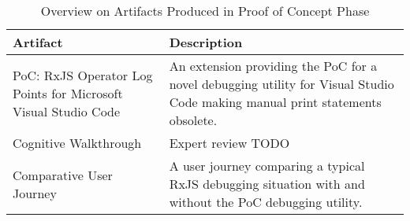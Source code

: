 
\begin{table}[H]
  \label{tbl:phase-2-artifacts}
  \caption{Overview on Artifacts Produced in Proof of Concept Phase}

  \begin{tabular}{|l|l|}
    \hline
    \bf{Artifact}       & \bf{Description} \\ \hline
    PoC: RxJS Operator Log Points for Microsoft Visual Studio Code & An extension providing the PoC for a novel debugging utility for Visual Studio Code making manual print statements obsolete. \\ \hline
    Cognitive Walkthrough & Expert review TODO \\ \hline
    Comparative User Journey & A user journey comparing a typical RxJS debugging situation with and without the PoC debugging utility. \\ \hline
  \end{tabular}

\end{table}
